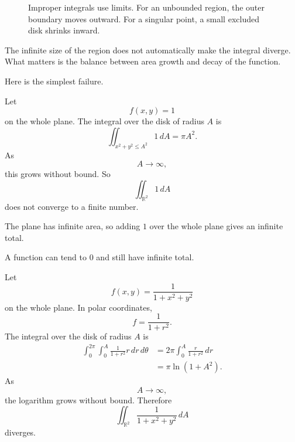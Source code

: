 \begin{figure}[h]
\centering
{}
\caption{Improper integrals use limits.  For an unbounded region, the outer boundary
moves outward.  For a singular point, a small excluded disk shrinks inward.}
\end{figure}

The infinite size of the region does not automatically make the integral diverge.  What
matters is the balance between area growth and decay of the function.

Here is the simplest failure.

\begin{example}
Let
\[
    f(x,y)=1
\]
on the whole plane.  The integral over the disk of radius \(A\) is
\[
    \iint_{x^2+y^2\le A^2}1\,dA=\pi A^2.
\]
As
\[
    A\to\infty,
\]
this grows without bound.  So
\[
\boxed{
    \iint_{\mathbb R^2}1\,dA
}
\]
does not converge to a finite number.

The plane has infinite area, so adding \(1\) over the whole plane gives an infinite total.
\end{example}

A function can tend to \(0\) and still have infinite total.

\begin{example}
Let
\[
    f(x,y)=\frac{1}{1+x^2+y^2}
\]
on the whole plane.  In polar coordinates,
\[
    f=\frac{1}{1+r^2}.
\]
The integral over the disk of radius \(A\) is
\[
\begin{aligned}
\int_0^{2\pi}\int_0^A \frac{1}{1+r^2}r\,dr\,d\theta
&=
2\pi\int_0^A \frac{r}{1+r^2}\,dr\\
&=
\pi\ln(1+A^2).
\end{aligned}
\]
As
\[
    A\to\infty,
\]
the logarithm grows without bound.  Therefore
\[
\boxed{
    \iint_{\mathbb R^2}\frac{1}{1+x^2+y^2}\,dA
}
\]
diverges.
\end{example}

